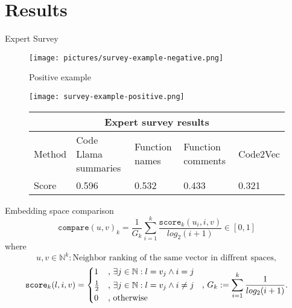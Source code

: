 \documentclass[aspectratio=1610,12pt]{beamer}
\begin{document}
\section{Results}
\begin{frame}[t]{Expert Survey}
    \begin{figure}
      \centering
      \begin{minipage}{0.45\textwidth}
          \centering
          \texttt{[image: pictures/survey-example-negative.png]}
          \caption{Positive example}
      \end{minipage}
      \begin{minipage}{0.45\textwidth}
          \centering
          \texttt{[image: survey-example-positive.png]}
          \caption{Negative example}
      \end{minipage}
      \begin{table}
        \begin{center}
          \scalebox{0.8} {
            \begin{tabular}{ |p{1.5cm}||p{4.5cm}|p{3.2cm}|p{4cm}|p{1.8cm}|  }
            \hline
            \multicolumn{5}{|c|}{Expert survey results} \\
            \hline
            Method & Code Llama summaries & Function names & Function comments
                   & Code2Vec \\
            \hline
            Score   & 0.596 & 0.532 & 0.433 & 0.321   \\
            \hline
            \end{tabular}
          }
        \end{center} 
      \end{table}
    \end{figure}
\end{frame}

\begin{frame}[t]{Embedding space comparison}
  \[
    \texttt{compare}(u,v)_k = 
      \frac{1}{G_k} \sum^{k}_{i=1} 
      \frac{ \texttt{score}_{k}(u_i,i,v)}{log_2(i+1)} 
      \in [0,1]
  \]
  where
  \[ u,v \in \mathbb{N}^k: \text{Neighbor ranking of the same vector in diffrent spaces},\]
  \[
    \texttt{score}_k(l,i,v) = \begin{cases*} 
        1 & , $\exists j \in \mathbb{N}: l = v_j \land i = j$   \\
        \frac{1}{2} & , $\exists j \in \mathbb{N}: l = v_j \land i \neq j$\\
        0   & , \text{otherwise}
      \end{cases*}  \text{  , }
      G_k := \sum_{i=1}^{k} \frac{1}{log_2(i+1)}.
  \]
\end{frame}
\end{document}
